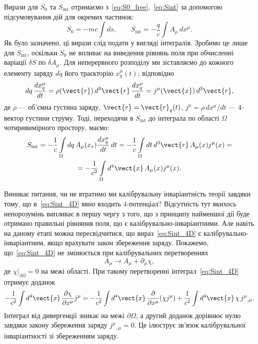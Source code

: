 Вирази для $S_0$ та $S_{\text{int}}$ отримаємо з~\eqref{eq:S0_free},~\eqref{eq:Sint} за допомогою підсумовування дій для окремих частинок:
\begin{equation}\label{eq:S_sum}
    S_0 = -mc\int ds, \qquad S_{\text{int}} = -\frac{q}{c}\int A_{\mu}\,dx^{\mu}.
\end{equation}
Як було зазначено, ці вирази слід подати у вигляді інтегралів. Зробимо це лише для $S_{\text{int}}$, оскільки $S_0$ не впливає на виведення рівнянь поля при обчисленні варіації $\delta S$ по $\delta A_{\mu}$. Для неперервного розподілу ми зіставляємо до кожного елементу заряду $dq$ його траєкторію $x_q^{\mu}(t)$; відповідно
\begin{equation*}
    dq\,\frac{dx_q^{\mu}}{dt} = \rho(\vect{r})\,d^3\vect{r}\,\frac{dx_q^{\mu}}{dt}
    = j^{\mu}(\vect{x})\,d^3\vect{r},
\end{equation*}
де $\rho$ --- об'ємна густина заряду, $\vect{r}=\vect{r}_q(t)$, $j^{\mu}=\rho\,dx^{\mu}/dt$ --- 4-вектор густини струму. Тоді, переходячи в $S_{\text{int}}$ до інтеграла по області $\Omega$ чотиривимірного простору, маємо:
\begin{multline}\label{eq:Sint_4D}
    S_{\text{int}} = -\frac{1}{c}\int\limits_{\Omega} dq\,A_{\mu}(x_e)\frac{dx_q^{\mu}}{dt}\,dt
    = -\frac{1}{c}\int\limits_{\Omega} dt\,d^3\vect{r}\,A_{\mu}(x)j^{\mu}(x) = \\
    = -\frac{1}{c^2}\int\limits_{\Omega} d^4\vect{x}\,A_{\mu}(x)j^{\mu}(x).
\end{multline}

Виникає питання, чи не втратимо ми калібрувальну інваріантність теорії завдяки тому, що в~\eqref{eq:Sint_4D} явно входить 4-потенціал? Відсутність тут якихось непорозумінь випливає в першу чергу з того, що з принципу найменшої дії буде отримано правильні рівняння поля, що є калібрувально-інваріантними. Але навіть на даному етапі можна пересвідчитися, що вираз~\eqref{eq:Sint_4D} є калібрувально-інваріантним, якщо врахувати закон збереження заряду. Покажемо, що~\eqref{eq:Sint_4D} не змінюється при калібрувальних перетвореннях
\begin{equation*}
    A_{\mu} \to A_{\mu} + \partial_{\mu}\chi,
\end{equation*}
де $\chi|_{\partial\Omega}=0$ на межі області. При такому перетворенні інтеграл~\eqref{eq:Sint_4D} отримує доданок
\begin{equation*}
    -\frac{1}{c^2}\int d^4\vect{x}\,\frac{\partial\chi}{\partial x^{\mu}}j^{\mu}
    = -\frac{1}{c^2}\int d^4\vect{x}\,\frac{\partial}{\partial x^{\mu}}(\chi j^{\mu})
    + \frac{1}{c^2}\int d^4\vect{x}\,\chi\,j^{\mu}{}_{,\mu}.
\end{equation*}
Інтеграл від дивергенції зникає на межі $\partial\Omega$, а другий доданок дорівнює нулю завдяки закону збереження заряду $j^{\mu}{}_{,\mu}=0$. Це ілюструє зв'язок калібрувальної інваріантності зі збереженням заряду.

